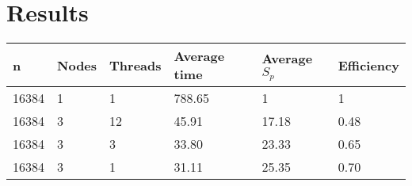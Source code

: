 \section{Results}

\begin{table}[H]
   \centering
    \begin{tabular}{| l | l | l | l | l | l |}
    \hline
    \bf{n} & \bf{Nodes} & \bf{Threads} & \bf{Average time} & \bf{Average }$S_{p}$ & \bf{Efficiency} \\ \hline
    	16384 & 1 & 1 & 788.65 & 1 & 1 \\ \hline
	16384 & 3 & 12 & 45.91 & 17.18 & 0.48 \\ \hline
	16384 & 3 & 3 & 33.80 & 23.33 & 0.65 \\ \hline
	16384 & 3 & 1 & 31.11 & 25.35 & 0.70  \\
    \hline
    \end{tabular}
\end{table}